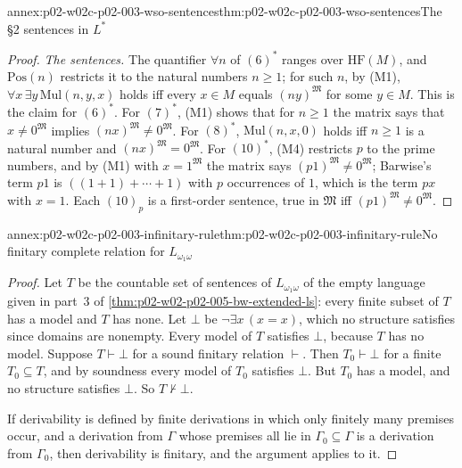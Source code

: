 \begin{annexitem}{annex:p02-w02c-p02-003-wso-sentences}{thm:p02-w02c-p02-003-wso-sentences}{The \S2 sentences in \(L^{*}\)}
\begin{proof}
\emph{The sentences.}  The quantifier \(\forall n\) of \((6)^{*}\) ranges
over \(\mathrm{HF}(M)\), and \(\mathrm{Pos}(n)\) restricts it to the
natural numbers \(n\geq1\); for such \(n\), by (M1),
\(\forall x\,\exists y\,\mathrm{Mul}(n,y,x)\) holds iff every \(x\in M\)
equals \((ny)^{\mathfrak M}\) for some \(y\in M\).  This is the claim for
\((6)^{*}\).  For \((7)^{*}\), (M1) shows that for \(n\geq1\) the matrix
says that \(x\neq0^{\mathfrak M}\) implies
\((nx)^{\mathfrak M}\neq0^{\mathfrak M}\).  For \((8)^{*}\),
\(\mathrm{Mul}(n,x,0)\) holds iff \(n\geq1\) is a natural number and
\((nx)^{\mathfrak M}=0^{\mathfrak M}\).  For \((10)^{*}\), (M4) restricts
\(p\) to the prime numbers, and by (M1) with \(x=1^{\mathfrak M}\) the
matrix says \((p1)^{\mathfrak M}\neq0^{\mathfrak M}\); Barwise's term
\(p1\) is \(((1+1)+\cdots+1)\) with \(p\) occurrences of \(1\), which is
the term \(px\) with \(x=1\).  Each \((10)_p\) is a first-order sentence,
true in \(\mathfrak M\) iff \((p1)^{\mathfrak M}\neq0^{\mathfrak M}\).
\end{proof}
\end{annexitem}

\begin{annexitem}{annex:p02-w02c-p02-003-infinitary-rule}{thm:p02-w02c-p02-003-infinitary-rule}{No finitary complete relation for \(L_{\omega_1\omega}\)}
\begin{proof}
Let \(T\) be the countable set of sentences of \(L_{\omega_1\omega}\) of
the empty language given in part~3 of
\cref{thm:p02-w02-p02-005-bw-extended-ls}: every finite subset of \(T\)
has a model and \(T\) has none.  Let \(\bot\) be \(\neg\exists x\,(x=x)\),
which no structure satisfies since domains are nonempty.  Every model of
\(T\) satisfies \(\bot\), because \(T\) has no model.  Suppose
\(T\vdash\bot\) for a sound finitary relation \(\vdash\).  Then
\(T_0\vdash\bot\) for a finite \(T_0\subseteq T\), and by soundness every
model of \(T_0\) satisfies \(\bot\).  But \(T_0\) has a model, and no
structure satisfies \(\bot\).  So \(T\nvdash\bot\).

If derivability is defined by finite derivations in which only finitely
many premises occur, and a derivation from \(\Gamma\) whose premises all
lie in \(\Gamma_0\subseteq\Gamma\) is a derivation from \(\Gamma_0\), then
derivability is finitary, and the argument applies to it.
\end{proof}
\end{annexitem}

